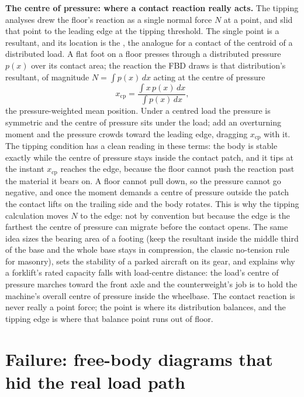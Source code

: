 \begin{mastery}
\textbf{The centre of pressure: where a contact reaction really acts.} The
tipping analyses drew the floor's reaction as a single normal force $N$ at a
point, and slid that point to the leading edge at the tipping threshold. The
single point is a resultant, and its location is the , the analogue for a contact of the centroid of a distributed load. A
flat foot on a floor presses through a distributed pressure $p(x)$ over its
contact area; the reaction the FBD draws is that distribution's resultant, of
magnitude $N = \int p(x)\,dx$ acting at the centre of pressure
\[
x_{\text{cp}} = \frac{\int x\,p(x)\,dx}{\int p(x)\,dx},
\]
the pressure-weighted mean position. Under a centred load the pressure is
symmetric and the centre of pressure sits under the load; add an overturning
moment and the pressure crowds toward the leading edge, dragging $x_{\text{cp}}$
with it. The tipping condition has a clean reading in these terms: the body is
stable exactly while the centre of pressure stays inside the contact patch, and
it tips at the instant $x_{\text{cp}}$ reaches the edge, because the floor
cannot push the reaction past the material it bears on. A floor cannot pull
down, so the pressure cannot go negative, and once the moment demands a centre
of pressure outside the patch the contact lifts on the trailing side and the
body rotates. This is why the tipping calculation moves $N$ to the edge: not by
convention but because the edge is the farthest the centre of pressure can
migrate before the contact opens. The same idea sizes the bearing area of a
footing (keep the resultant inside the middle third of the base and the whole
base stays in compression, the classic no-tension rule for masonry), sets the
stability of a parked aircraft on its gear, and explains why a forklift's rated
capacity falls with load-centre distance: the load's centre of pressure marches
toward the front axle and the counterweight's job is to hold the machine's
overall centre of pressure inside the wheelbase. The contact reaction is never
really a point force; the point is where its distribution balances, and the
tipping edge is where that balance point runs out of floor.
\end{mastery}

\section{Failure: free-body diagrams that hid the real load path}

